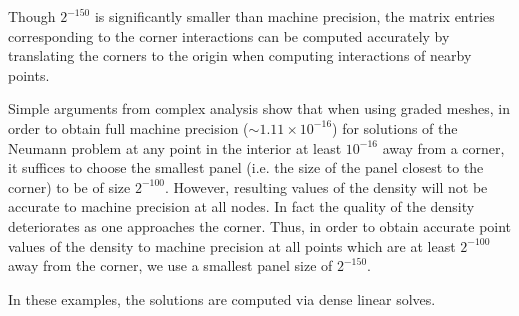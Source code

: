 \begin{rem}
Though $2^{-150}$ is significantly smaller than machine precision, the matrix entries corresponding to the
corner interactions can be computed accurately by translating the corners to the origin when 
computing interactions of nearby points.
\end{rem} 
\begin{rem}
Simple arguments from complex analysis show that when using graded meshes, in order to obtain full 
machine precision 
($\sim 1.11 \times 10^{-16}$) for solutions of the Neumann problem at any point in the interior 
at least $10^{-16}$ away from a corner, it suffices to choose the smallest panel (i.e. the size of the 
panel closest to the corner) to be of size $2^{-100}.$ However, resulting values of the density will not be 
accurate to machine precision at all nodes. In fact the quality
of the density deteriorates as one approaches the corner. Thus, in order to obtain accurate point values
of the density to machine precision at all points which are at least $2^{-100}$ away from the corner, we use a smallest
panel size of $2^{-150}$. 
\end{rem}
In these examples, the solutions are computed via dense linear solves.

